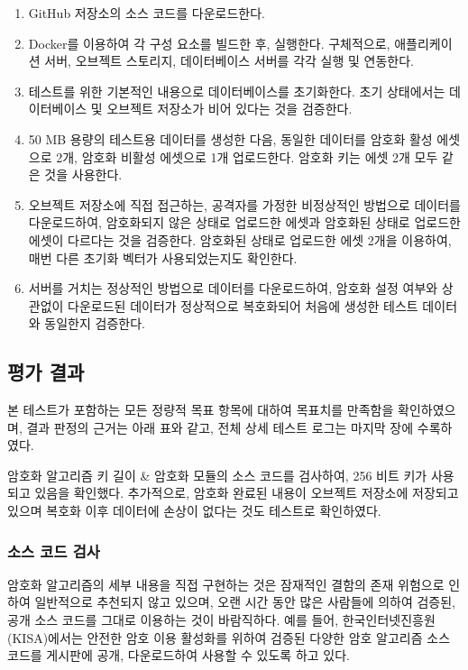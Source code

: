 \documentclass[11pt,oneside,openany,itemph,a4paper,chapter]{oblivoir}
\newenvironment{tablekeyvalue}[2]
{\bgroup
\table[H] \tabularx{\linewidth}{|
>{\setlength{\baselineskip}{1.2\baselineskip}}P{#1\linewidth}|
>{\setlength{\baselineskip}{1.2\baselineskip}}P{#2\linewidth}|}
\hline}
{\endtabularx \endtable \egroup}
\begin{document}
\begin{enumerate}
    \item GitHub 저장소의 소스 코드를 다운로드한다.
    \item Docker를 이용하여 각 구성 요소를 빌드한 후, 실행한다. 구체적으로, 애플리케이션 서버, 오브젝트 스토리지, 데이터베이스 서버를 각각 실행 및 연동한다.
    \item 테스트를 위한 기본적인 내용으로 데이터베이스를 초기화한다. 초기 상태에서는 데이터베이스 및 오브젝트 저장소가 비어 있다는 것을 검증한다.
    \item 50 MB 용량의 테스트용 데이터를 생성한 다음, 동일한 데이터를 암호화 활성 에셋으로 2개, 암호화 비활성 에셋으로 1개 업로드한다. 암호화 키는 에셋 2개 모두 같은 것을 사용한다.
    \item 오브젝트 저장소에 직접 접근하는, 공격자를 가정한 비정상적인 방법으로 데이터를 다운로드하여, 암호화되지 않은 상태로 업로드한 에셋과 암호화된 상태로 업로드한 에셋이 다르다는 것을 검증한다. 암호화된 상태로 업로드한 에셋 2개을 이용하여, 매번 다른 초기화 벡터가 사용되었는지도 확인한다.
    \item 서버를 거치는 정상적인 방법으로 데이터를 다운로드하여, 암호화 설정 여부와 상관없이 다운로드된 데이터가 정상적으로 복호화되어 처음에 생성한 테스트 데이터와 동일한지 검증한다.
\end{enumerate}

\subsection{평가 결과}
본 테스트가 포함하는 모든 정량적 목표 항목에 대하여 목표치를 만족함을 확인하였으며, 결과 판정의 근거는 아래 표와 같고, 전체 상세 테스트 로그는 마지막 장에 수록하였다.

\begin{tablekeyvalue}{0.3}{0.7}
암호화 알고리즘 키 길이 & 암호화 모듈의 소스 코드를 검사하여, 256 비트 키가 사용되고 있음을 확인했다. 추가적으로, 암호화 완료된 내용이 오브젝트 저장소에 저장되고 있으며 복호화 이후 데이터에 손상이 없다는 것도 테스트로 확인하였다. \\ \hline
\end{tablekeyvalue}

\subsubsection{소스 코드 검사}
암호화 알고리즘의 세부 내용을 직접 구현하는 것은 잠재적인 결함의 존재 위험으로 인하여 일반적으로 추천되지 않고 있으며, 오랜 시간 동안 많은 사람들에 의하여 검증된, 공개 소스 코드를 그대로 이용하는 것이 바람직하다. 예를 들어, 한국인터넷진흥원(KISA)에서는 안전한 암호 이용 활성화를 위하여 검증된 다양한 암호 알고리즘 소스 코드를 게시판에 공개, 다운로드하여 사용할 수 있도록 하고 있다.
\end{document}
